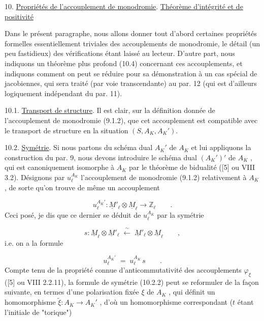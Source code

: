 

10. \underline{Propriétés de l'accouplement de monodromie}. \underline{Théorème d'intégrité et de positivité}

Dans le présent paragraphe, nous allons donner tout d'abord certaines propriétés formelles essentiellement triviales des accouplements de monodromie, le détail (un peu fastidieux) des vérifications étant laissé au lecteur. D'autre part, nous indiquons un théorème plus profond (10.4) concernant ces accouplements, et indiquons comment on peut se réduire pour sa démonstration à un cas spécial de jacobiennes, qui sera traité (par voie transcendante) au par. 12 (qui est d'ailleurs logiquement indépendant du par. 11).

10.1. \underline{Transport de structure}. Il est clair, sur la définition donnée de l'accouplement de monodromie (9.1.2), que cet accouplement est compatible avec le transport de structure en la situation $(S,A_K,A_K')$.

10.2. \underline{Symétrie}. Si nous partons du schéma dual $A_K'$ de $A_K$ et lui appliquons la construction du par. 9, nous devons introduire le schéma dual $(A_K')'$ de $A_K$ , qui est canoniquement isomorphe à $A_K$ par le théorème de bidualité ([5] ou VIII 3.2). Désignons par $u_\ell^{A_K}$ l'accouplement de monodromie (9.1.2) relativement à $A_K$ , de sorte qu'on trouve de même un accouplement

\begin{equation}\tag{10.2.1}
u_\ell^{A_K'} : \underline{M}'_\ell \otimes \underline{M}_\ell \longrightarrow \mathbb{Z}_\ell \qquad .
\end{equation}
Ceci posé, je dis que ce dernier se déduit de $u_\ell^{A_K}$ par la symétrie

\begin{equation*}
s : \underline{M}_\ell \otimes \underline{M}'_\ell \;\xleftarrow{\;\sim\;}\; \underline{M}'_\ell \otimes \underline{M}_\ell \qquad ,
\end{equation*}
i.e. on a la formule



\begin{equation}\tag{10.2.2}
u_\ell^{A_K'} \;=\; u_\ell^{A_K}\, s \qquad .
\end{equation}
Compte tenu de la propriété connue d'anticommutativité des accouplements $\varphi_\xi$ ([5] ou VIII 2.2.11), la formule de symétrie (10.2.2) peut se reformuler de la façon suivante, en termes d'une polarisation fixée $\xi$ de $A_K$ , qui définit un homomorphisme $\widetilde{\xi} : A_K \longrightarrow A_K'$ , d'où un homomorphisme correspondant ($t$ étant l'initiale de "torique")

